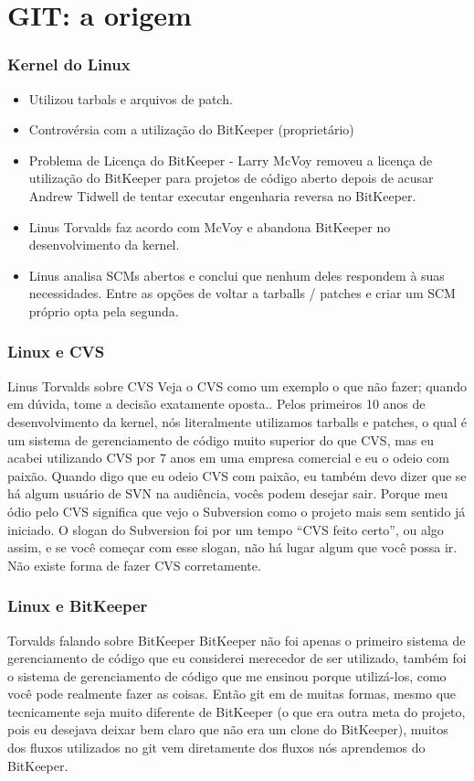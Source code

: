 \documentclass{beamer}
\begin{document}
\section{GIT: a origem}

\begin{frame}
\frametitle{Kernel do Linux}

\begin{itemize}
\item Utilizou tarbals e arquivos de patch.
\item Controvérsia com a utilização do BitKeeper (proprietário)
\item Problema de Licença do BitKeeper - Larry McVoy removeu a licença de utilização do BitKeeper para projetos de código aberto depois de acusar Andrew Tidwell de tentar executar engenharia reversa no BitKeeper.
\item Linus Torvalds faz acordo com McVoy e abandona BitKeeper no desenvolvimento da kernel.
\item Linus analisa SCMs abertos e conclui que nenhum deles respondem à suas necessidades. Entre as opções de voltar a tarballs / patches e criar um SCM próprio opta pela segunda.
\end{itemize}
\end{frame}

\begin{frame}
\frametitle{Linux e CVS}

\begin{block}{Linus Torvalds sobre CVS}
Veja o CVS como um exemplo o que não fazer; quando em dúvida, tome a decisão exatamente oposta..
Pelos primeiros 10 anos de desenvolvimento da kernel, nós literalmente utilizamos tarballs e patches, o qual é um sistema de gerenciamento de código muito superior do que CVS, mas eu acabei utilizando CVS por 7 anos em uma
empresa comercial e eu o odeio com paixão. Quando digo que eu odeio CVS com paixão, eu também devo dizer que se há algum usuário de SVN na audiência, vocês podem desejar sair. Porque meu ódio pelo CVS significa que
vejo o Subversion como o projeto mais sem sentido já iniciado. O slogan do Subversion foi por um tempo “CVS feito certo”, ou algo assim, e se você começar com esse slogan, não há lugar algum que você possa ir. Não existe forma de fazer CVS corretamente.
\end{block}
\end{frame}

\begin{frame}
\frametitle{Linux e BitKeeper}
\begin{block}{Torvalds falando sobre BitKeeper}
BitKeeper não foi apenas o primeiro sistema de gerenciamento de código que eu considerei merecedor de ser utilizado, também foi o sistema de gerenciamento de código que me ensinou porque utilizá-los, como você pode realmente fazer as coisas. Então git em de muitas formas, mesmo que tecnicamente seja muito diferente de BitKeeper (o que era outra meta do projeto, pois eu desejava deixar bem claro que não era um clone do BitKeeper), muitos dos fluxos utilizados no git vem diretamente dos fluxos nós aprendemos do BitKeeper.
\end{block}
\end{frame}
\end{document}
